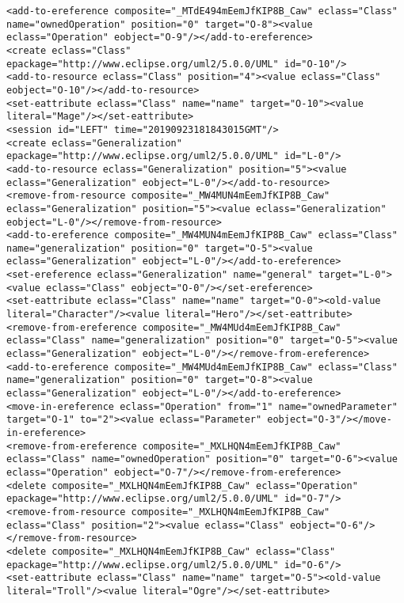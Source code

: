 \begin{lstlisting}[style=cbpfile,caption={Change-based representation of the model in Figure \ref{fig:class_diagram_left}.},label=lst:class_diagram_left_cbpfile]
<add-to-ereference composite="_MTdE494mEemJfKIP8B_Caw" eclass="Class" name="ownedOperation" position="0" target="O-8"><value eclass="Operation" eobject="O-9"/></add-to-ereference>
<create eclass="Class" epackage="http://www.eclipse.org/uml2/5.0.0/UML" id="O-10"/>
<add-to-resource eclass="Class" position="4"><value eclass="Class" eobject="O-10"/></add-to-resource>
<set-eattribute eclass="Class" name="name" target="O-10"><value literal="Mage"/></set-eattribute>
<session id="LEFT" time="20190923181843015GMT"/>
<create eclass="Generalization" epackage="http://www.eclipse.org/uml2/5.0.0/UML" id="L-0"/>
<add-to-resource eclass="Generalization" position="5"><value eclass="Generalization" eobject="L-0"/></add-to-resource>
<remove-from-resource composite="_MW4MUN4mEemJfKIP8B_Caw" eclass="Generalization" position="5"><value eclass="Generalization" eobject="L-0"/></remove-from-resource>
<add-to-ereference composite="_MW4MUN4mEemJfKIP8B_Caw" eclass="Class" name="generalization" position="0" target="O-5"><value eclass="Generalization" eobject="L-0"/></add-to-ereference>
<set-ereference eclass="Generalization" name="general" target="L-0"><value eclass="Class" eobject="O-0"/></set-ereference>
<set-eattribute eclass="Class" name="name" target="O-0"><old-value literal="Character"/><value literal="Hero"/></set-eattribute>
<remove-from-ereference composite="_MW4MUd4mEemJfKIP8B_Caw" eclass="Class" name="generalization" position="0" target="O-5"><value eclass="Generalization" eobject="L-0"/></remove-from-ereference>
<add-to-ereference composite="_MW4MUd4mEemJfKIP8B_Caw" eclass="Class" name="generalization" position="0" target="O-8"><value eclass="Generalization" eobject="L-0"/></add-to-ereference>
<move-in-ereference eclass="Operation" from="1" name="ownedParameter" target="O-1" to="2"><value eclass="Parameter" eobject="O-3"/></move-in-ereference>
<remove-from-ereference composite="_MXLHQN4mEemJfKIP8B_Caw" eclass="Class" name="ownedOperation" position="0" target="O-6"><value eclass="Operation" eobject="O-7"/></remove-from-ereference>
<delete composite="_MXLHQN4mEemJfKIP8B_Caw" eclass="Operation" epackage="http://www.eclipse.org/uml2/5.0.0/UML" id="O-7"/>
<remove-from-resource composite="_MXLHQN4mEemJfKIP8B_Caw" eclass="Class" position="2"><value eclass="Class" eobject="O-6"/></remove-from-resource>
<delete composite="_MXLHQN4mEemJfKIP8B_Caw" eclass="Class" epackage="http://www.eclipse.org/uml2/5.0.0/UML" id="O-6"/>
<set-eattribute eclass="Class" name="name" target="O-5"><old-value literal="Troll"/><value literal="Ogre"/></set-eattribute>

\end{lstlisting}
